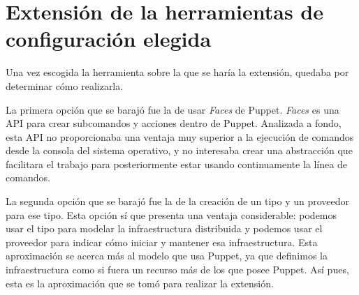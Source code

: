 \section{Extensión de la herramientas de configuración elegida}

Una vez escogida la herramienta sobre la que se haría la extensión, quedaba por determinar cómo realizarla.

La primera opción que se barajó fue la de usar \emph{Faces} de Puppet. \emph{Faces} es una API para crear subcomandos y acciones dentro de Puppet. Analizada a fondo, esta API no proporcionaba una ventaja muy superior a la ejecución de comandos desde la consola del sistema operativo, y no interesaba crear una abstracción que facilitara el trabajo para posteriormente estar usando continuamente la línea de comandos.

La segunda opción que se barajó fue la de la creación de un tipo y un proveedor para ese tipo. Esta opción sí que presenta una ventaja considerable: podemos usar el tipo para modelar la infraestructura distribuida y podemos usar el proveedor para indicar cómo iniciar y mantener esa infraestructura. Esta aproximación se acerca más al modelo que usa Puppet, ya que definimos la infraestructura como si fuera un recurso más de los que posee Puppet. Así pues, esta es la aproximación que se tomó para realizar la extensión.

